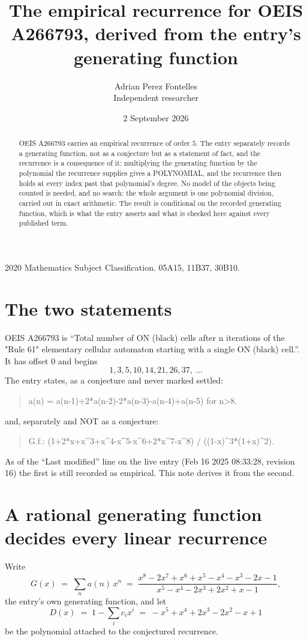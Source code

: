 \documentclass[11pt,a4paper]{article}
\title{The empirical recurrence for OEIS A266793, derived from the entry's generating function}
\author{Adrian Perez Fontelles\\ \small Independent researcher}
\date{2 September 2026}
\theoremstyle{plain}
\theoremstyle{definition}
\begin{document}
\maketitle

\begin{abstract}
OEIS A266793 carries an empirical recurrence of order $5$. The entry separately records a
generating function, not as a conjecture but as a statement of fact, and the recurrence is a
consequence of it: multiplying the generating function by the polynomial the recurrence
supplies gives a POLYNOMIAL, and the recurrence then holds at every index past that
polynomial's degree. No model of the objects being counted is needed, and no search: the
whole argument is one polynomial division, carried out in exact arithmetic. The result is
conditional on the recorded generating function, which is what the entry asserts and what is
checked here against every published term.
\end{abstract}

\noindent\small 2020 Mathematics Subject Classification. 05A15, 11B37, 30B10.\normalsize

\section{The two statements}

OEIS A266793 is ``Total number of ON (black) cells after n iterations of the "Rule 61" elementary cellular automaton starting with a single ON (black) cell.''. It has offset $0$ and begins
\[
1, 3, 5, 10, 14, 21, 26, 37,\ \dots
\]
The entry states, as a conjecture and never marked settled:
\begin{quote}
a(n) = a(n-1)+2*a(n-2)-2*a(n-3)-a(n-4)+a(n-5) for n>8.
\end{quote}
and, separately and NOT as a conjecture:
\begin{quote}
G.f.: (1+2*x+x\^{}3+x\^{}4-x\^{}5-x\^{}6+2*x\^{}7-x\^{}8) / ((1-x)\^{}3*(1+x)\^{}2).
\end{quote}
As of the ``Last modified'' line on the live entry (Feb 16 2025 08:33:28, revision 16) the first is still
recorded as empirical. This note derives it from the second.

\section{A rational generating function decides every linear recurrence}

Write
\[
G(x)\;=\;\sum_{n}a(n)\,x^{n}\;=\;\frac{x^{8} - 2 x^{7} + x^{6} + x^{5} - x^{4} - x^{3} - 2 x - 1}{x^{5} - x^{4} - 2 x^{3} + 2 x^{2} + x - 1},
\]
the entry's own generating function, and let
\[
D(x)\;=\;1-\sum_i c_i x^{i}\;=\;- x^{5} + x^{4} + 2 x^{3} - 2 x^{2} - x + 1
\]
be the polynomial attached to the conjectured recurrence.
\end{document}
